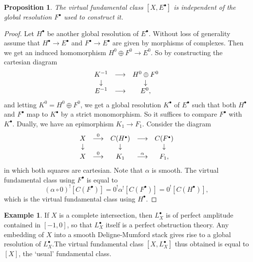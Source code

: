 \documentclass[11pt]{article}
\theoremstyle{plain}
\newtheorem{prop}{Proposition}[section]
\theoremstyle{definition}
\newtheorem{examplep}{Example}\renewcommand{\theexamplep}{}
\newenvironment{example}{\begin{examplep}\normalfont}{\end{examplep}}
\newenvironment{pf}{\begin{proof}}{\end{proof}}
\newcommand{\upsh}{^{!}}
\newcommand{\com}{^{\scriptscriptstyle\bullet}}
\newcommand{\comp}{\mathbin{{\scriptstyle\circ}}}
\newcommand{\ldiag}[1]
       {\makebox[0cm]{\({\scriptstyle#1}\downarrow\phantom{\scriptstyle#1}\)}}
\newcommand{\rdiag}[1]
       {\makebox[0cm]{\(\phantom{\scriptstyle#1}\downarrow{\scriptstyle#1}\)}}
\newcommand{\comdia}[9]{
\begin{array}{ccc}
#1 & \stackrel{#2}{\longrightarrow} & #3 \\
\ldiag{#4} & #5 & \rdiag{#6} \\
#7 & \stackrel{#8}{\longrightarrow} & #9
\end{array}}
\theoremstyle{plain}
\theoremstyle{definition}
\theoremstyle{remark}
\begin{document}
\begin{prop} \label{vfcigr}
The virtual fundamental class \([X,E\com]\) is independent of the global
resolution \(F\com\) used to construct it.
\end{prop}
\begin{pf} Let \(H\com\) be another global resolution of \(E\com\). Without loss of
generality assume that
\(H\com\rightarrow E\com\) and \(F\com\rightarrow E\com\) are given by morphisms of
complexes. Then we get an induced homomorphism \(H^0\oplus F^0\rightarrow E^0\).
So by constructing the cartesian diagram
\[
\comdia{K^{-1}}{}{H^0\oplus F^0}{}{}{}{E^{-1}}{}{E^0,}
\]
and letting
\(K^0=H^0\oplus F^0\), we get a global resolution \(K\com\) of \(E\com\) such that
both
\(H\com\) and \(F\com\) map to \(K\com\) by a strict monomorphism. So it suffices to
compare \(F\com\) with
\(K\com\). Dually, we have an epimorphism \(K_1\rightarrow F_1\). Consider the
diagram
\[
\begin{array}{ccccc} X & \stackrel{0}{\longrightarrow} & C(H\com) &
\longrightarrow & C(F\com) \\
\ldiag{} & & \ldiag{} & & \rdiag{} \\ X & \stackrel{0}{\longrightarrow} & K_1 &
\stackrel{\alpha}{\longrightarrow} & F_1,
\end{array}
\]
in which both squares are cartesian. Note that \(\alpha\) is
smooth.
The virtual fundamental class using \(F\com\) is equal to
\[
(\alpha\comp
0)\upsh[C(F\com)]=0\upsh\alpha\upsh[C(F\com)]=0\upsh[C(H\com)],
\]
which is the virtual fundamental class using \(H\com\).
\end{pf}

\begin{example} If \(X\) is a  complete intersection, then \(L_X\com\) is of
perfect amplitude contained in
\([-1,0]\), so that \(L_X\com\) itself is a perfect obstruction theory.
Any embedding of \(X\) into a smooth Deligne-Mumford stack gives rise to
a global resolution of \(L_X\com\).The virtual fundamental class
\([X,L_X\com]\) thus obtained is equal to \([X]\), the `usual' fundamental
class.
\end{example}
\end{document}
